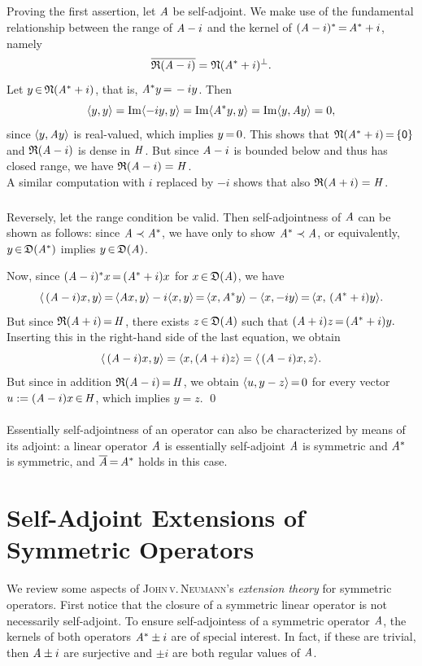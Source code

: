 \documentclass[11pt,twoside]{article}
\begin{document}
\subparagraph*{}
Proving the first assertion,
let $\mathit{A}$ be self-adjoint. 
We make use of the fundamental relationship
between the range of $\mathit{A}-i$
and the kernel of $(\mathit{A}-i)^* {\,=\,} \mathit{A}^* +i$,
namely
\[
\overline{\mathfrak{R}(\mathit{A}-i)} = \mathfrak{N}(\mathit{A}^*+i)^{\bot}.
\]
Let $y {\,\in\,} \mathfrak{N}(\mathit{A}^*+i)$,
that is, $\mathit{A}^* y {\,=\,} -i y$.
Then
\[
\langle y,y \rangle =
\operatorname{Im} \langle -i y,y \rangle =
\operatorname{Im} \langle \mathit{A}^* y,y \rangle =
\operatorname{Im} \langle y,\mathit{A} y \rangle = 0,
\]
since $\langle y,\mathit{A} y \rangle$ is real-valued, which implies $y {\,=\,} 0$.
This shows that $\mathfrak{N}(\mathit{A}^* +i) {\,=\,} \{ {\mathsf{0}} \}$
and $\mathfrak{R}(\mathit{A}-i)$ is dense in $\mathit{H}$.
But since $\mathit{A}-i$ is bounded below and thus has closed range,
we have $\mathfrak{R}(\mathit{A}-i)=\mathit{H}$.\\
A similar computation with $i$ replaced by $-i$ shows
that also $\mathfrak{R}(\mathit{A}+i)=\mathit{H}$.

\subparagraph*{}
Reversely,
let the range condition be valid.
Then self-adjointness of $\mathit{A}$ can be shown as follows:
since $\mathit{A} \prec \mathit{A}^*$,
we have only to show $\mathit{A}^* \prec \mathit{A}$, or equivalently,
$y {\,\in\,} \mathfrak{D}(\mathit{A}^*)$ implies $y {\,\in\,} \mathfrak{D}(\mathit{A})$.

Now,
since $(\mathit{A}-i)^*x {\,=\,} (\mathit{A}^* +i)x$ for $x {\,\in\,} \mathfrak{D}(\mathit{A})$,
we have
\[
\langle \,(\mathit{A}-i)x,y \rangle {\,=\,} \langle \mathit{A} x,y \rangle -i\langle x,y \rangle {\,=\,}
\langle x,\mathit{A}^*y \rangle -\langle x,-iy \rangle {\,=\,} \langle x,\,(\mathit{A}^* +i)y \rangle.
\]
But since $\mathfrak{R}(\mathit{A}+i) {\,=\,} \mathit{H}$,
there exists $z {\,\in\,} \mathfrak{D}(\mathit{A})$ such that
$
(\mathit{A} + i)z {\,=\,} (\mathit{A}^* +i)y.
$
Inserting this in the right-hand side of the last equation, we obtain
\[
\langle \,(\mathit{A}-i)x,y \rangle = \langle x,(\mathit{A} + i)z \rangle = \langle \,(A-i)x,z \rangle.
\]
But since in addition $\mathfrak{R}(\mathit{A}-i) {\,=\,} \mathit{H}$, we obtain
$\langle u,y-z \rangle {\,=\,} 0$ for every vector $u := (\mathit{A}-i)x {\,\in\,} \mathit{H}$,
which implies $y=z$.
\qed

\paragraph*{}
Essentially self-adjointness of an operator can also be characterized
by means of its adjoint:
a linear operator $\mathit{A}$ is essentially self-adjoint
\iff
$\mathit{A}$ is symmetric and $\mathit{A}^*$ is symmetric,
and $\overline{\mathit{A}} {\,=\,} \mathit{A}^*$ holds in this case.

\section{Self-Adjoint Extensions of Symmetric Operators}
We review some aspects of \textsc{John\,v.\,Neumann}'s 
\textit{extension theory} for symmetric operators.
First notice that the closure of a symmetric linear operator is not
necessarily self-adjoint.
To ensure self-adjointess of a symmetric operator $\mathit{A}$,
the kernels of both operators $\mathit{A}^* \pm i$ are of special interest.
In fact,
if these are trivial,
then $\mathit{A} \pm i$ are surjective and
$\pm i$ are both regular values of $\mathit{A}$.
\end{document}
